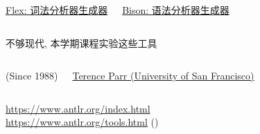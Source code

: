 \begin{frame}{}
  \begin{columns}
    \begin{center}
      \href{https://en.wikipedia.org/wiki/Flex_(lexical_analyser_generator)}{\footnotesize Flex: 词法分析器生成器}
    \end{center}
    \begin{center}
      \href{https://en.wikipedia.org/wiki/GNU_Bison}{\footnotesize Bison: 语法分析器生成器}
    \end{center}
  \end{columns}

  \vspace{0.50cm}
  \begin{center}
    不够现代, 本学期课程实验这些工具
  \end{center}
\end{frame}

\begin{frame}{}
  \begin{columns}
    \begin{center}
      (Since 1988)
    \end{center}
    \begin{center}
      \href{https://parrt.cs.usfca.edu/}{\small Terence Parr (University of San Francisco)}
    \end{center}
  \end{columns}

  \vspace{0.80cm}
  \begin{center}
    \url{https://www.antlr.org/index.html} \\[5pt]
    \url{https://www.antlr.org/tools.html} ()
  \end{center}
\end{frame}

